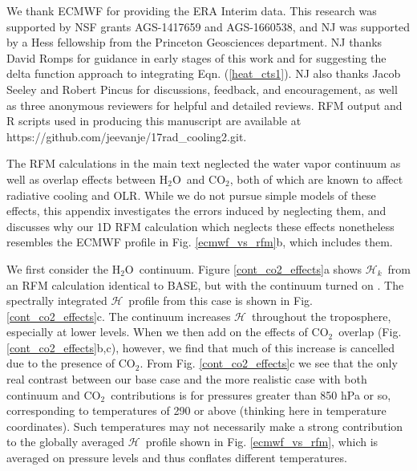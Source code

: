 \documentclass{ametsoc}
\newcommand{\eqnref}[1]{(\ref{#1})}
\newcommand{\cotwo}{\ensuremath{\mathrm{CO_2}}}
\newcommand{\htwo}{\ensuremath{\mathrm{H_2O}}}
\newcommand{\ch}{\ensuremath{\mathcal{H}}}
\newcommand{\chk}{\ensuremath{\ch_k}}
\begin{document}



%
\acknowledgments
We thank ECMWF for providing the ERA Interim data. This research was supported by NSF grants AGS-1417659 and AGS-1660538, and NJ was supported by a  Hess fellowship from the Princeton Geosciences department. NJ thanks David Romps for guidance in early stages of this work and for suggesting the delta function approach to integrating Eqn. \eqnref{heat_cts1}. NJ also thanks Jacob Seeley and Robert Pincus for discussions, feedback, and encouragement, as well as three anonymous reviewers for helpful and detailed reviews. RFM output and R scripts used in producing this manuscript are available at  https://github.com/jeevanje/17rad\_cooling2.git.

%


\appendix[A] \label{sec_cont_co2}
\appendixtitle{Sensitivity to \htwo\ continuum and \cotwo\ overlap} 
The RFM  calculations in the main text  neglected the water vapor continuum as well as overlap effects between \htwo\ and \cotwo, both of which are known to affect radiative cooling and OLR. While we do not pursue simple models of these effects, this appendix investigates the errors induced by neglecting them, and discusses why our 1D RFM calculation which neglects these effects nonetheless resembles the ECMWF profile in Fig. \ref{ecmwf_vs_rfm}b, which includes them.

We first consider the \htwo\ continuum. Figure \ref{cont_co2_effects}a shows \chk\ from an RFM calculation identical to BASE, but with the continuum turned on \citep[RFM contains a hard-coded version of the MT\_CKD continuum,][]{mlawer2012}. The spectrally integrated \ch\ profile from this case is shown in Fig. \ref{cont_co2_effects}c. The continuum increases \ch\ throughout the troposphere, especially at lower levels. When we then add on the effects of \cotwo\ overlap (Fig. \ref{cont_co2_effects}b,c), however, we find that much of this increase is cancelled due to the presence of \cotwo. From Fig. \ref{cont_co2_effects}c we see that  the only real contrast between our base case and the more realistic case with both continuum and \cotwo\ contributions is for pressures greater than  850 hPa or so, corresponding to temperatures of 290 or above (thinking here in temperature coordinates). Such temperatures  may not necessarily make a strong contribution to the globally averaged \ch\ profile shown in Fig. \ref{ecmwf_vs_rfm}, which is averaged on pressure levels and thus conflates different temperatures.
\end{document}
